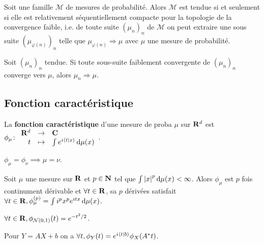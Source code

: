 	\begin{thm}
		Soit une famille $\mathcal{M}$ de mesures de probabilité.
		Alors $\mathcal{M}$ est tendue si et seulement si elle est relativement séquentiellement compacte pour la topologie de la convergence faible, i.e. de toute suite $(\mu_n)_n$ de $\mathcal{M}$ on peut extraire une sous suite $(\mu_{\varphi(n)})_n$ telle que $\mu_{\varphi(n)} \Rightarrow \mu$ avec $\mu$ une mesure de probabilité.
	\end{thm}

	\begin{pop}
		Soit $(\mu_n)_n$ tendue.
		Si toute sous-suite faiblement convergente de $(\mu_n)_n$ converge vers $\mu$, alors $\mu_n \Rightarrow \mu$.
	\end{pop}


\subsection{Fonction caractéristique}

	\begin{defn}
		La \textbf{fonction caractéristique} d'une mesure de proba $\mu$ sur $\mathbf{R}^d$ est
		$\phi_\mu \colon \begin{array}{rcl}
		\mathbf{R}^d & \to & \mathbf{C} \\
		t & \mapsto & \int e^{i \left\langle t \mid x \right\rangle} \mathop{}\mathopen{}\mathrm{d} \mu(x)
		\end{array}$.
	\end{defn}
	
	\begin{thm}
		$\phi_\mu = \phi_\nu \implies \mu = \nu$.
	\end{thm}
	
	\begin{pop}
		Soit $\mu$ une mesure sur $\mathbf{R}$ et $p \in \mathbf{N}$ tel que $\int \left\lvert x\right\rvert^p \mathop{}\mathopen{}\mathrm{d} \mu(x) < \infty$.
		Alors $\phi_\mu$ est $p$ fois continument dérivable et $\forall t \in \mathbf{R}$, sa $p$ dérivées satisfait $\forall t \in \mathbf{R}, \phi_\mu^{(p)} = \int i^p x^p e^{itx} \mathop{}\mathopen{}\mathrm{d} \mu(x)$.
	\end{pop}

	\begin{ex}
		$\forall t \in \mathbf{R}, \phi_{\mathcal{N}(0,1)}(t) = e^{-t^2/2}$.
	\end{ex}

	\begin{pop}
		Pour $Y = AX + b$ on a $\forall t, \phi_Y(t) = e^{i \left\langle t \mid b \right\rangle} \phi_X(A^* t)$.
	\end{pop}

